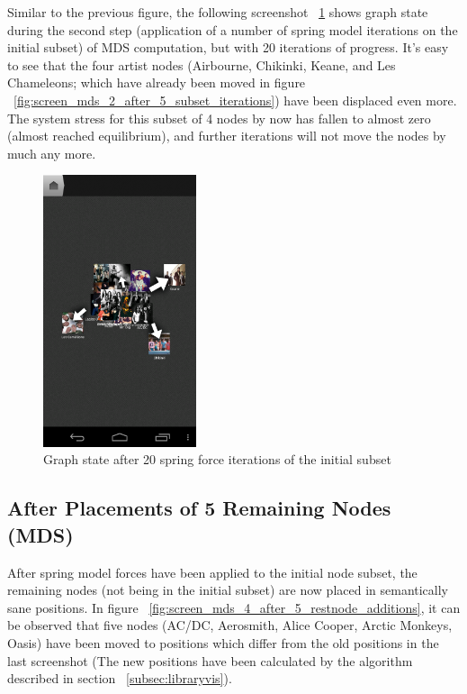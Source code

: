 Similar to the previous figure, the following screenshot ~\ref{fig:screen_mds_3_after_20_subset_iterations} shows graph state during the second step (application of a number of spring model iterations on the initial subset) of MDS computation, but with 20 iterations of progress. It's easy to see that the four artist nodes (Airbourne, Chikinki, Keane, and Les Chameleons; which have already been moved in figure ~\ref{fig:screen_mds_2_after_5_subset_iterations}) have been displaced even more. The system stress for this subset of 4 nodes by now has fallen to almost zero (almost reached equilibrium), and further iterations will not move the nodes by much any more.

\begin{figure}[H]
  \centering
    \includegraphics[width=0.4\textwidth]{figures/screen_mds_3_after_20_subset_iterations}
  \caption{Graph state after 20 spring force iterations of the initial subset}
  \label{fig:screen_mds_3_after_20_subset_iterations}
\end{figure}

\newpage
\subsection{After Placements of 5 Remaining Nodes (MDS)}

After spring model forces have been applied to the initial node subset, the remaining nodes (not being in the initial subset) are now placed in semantically sane positions. In figure ~\ref{fig:screen_mds_4_after_5_restnode_additions}, it can be observed that five nodes (AC/DC, Aerosmith, Alice Cooper, Arctic Monkeys, Oasis) have been moved to positions which differ from the old positions in the last screenshot (The new positions have been calculated by the algorithm described in section ~\ref{subsec:libraryvis}). 

